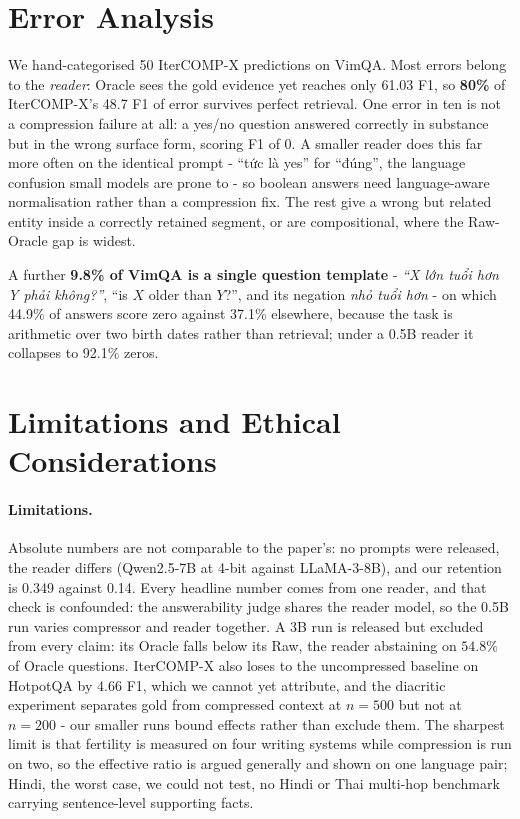 \documentclass{llncs}
\begin{document}
\section{Error Analysis}
\label{sec:vietnamese}
\label{sec:erroranalysis}
\label{app:errors}

We hand-categorised 50 IterCOMP-X predictions on VimQA. Most errors belong to the
\emph{reader}: Oracle sees the gold evidence yet reaches only 61.03 F1, so
\textbf{80\%} of IterCOMP-X's 48.7 F1 of error survives perfect retrieval. One
error in ten is not a compression failure at all: a yes/no question answered
correctly in substance but in the wrong surface form, scoring F1 of 0. A smaller reader does this far more often on the identical
prompt - ``tức là yes'' for ``đúng'', the language confusion small models are
prone to \cite{marchisio2024confusion} - so boolean answers need language-aware
normalisation rather than a compression fix. The rest give a wrong but related entity inside a correctly
retained segment, or are compositional, where the Raw-Oracle gap is widest.

A further \textbf{9.8\% of VimQA is a single question template} - \emph{``X lớn
tuổi hơn Y phải không?''}, ``is $X$ older than $Y$?'', and its negation
\emph{nhỏ tuổi hơn} - on which 44.9\% of answers score zero against 37.1\% elsewhere,
because the task is arithmetic over two birth dates rather than retrieval; under
a 0.5B reader it collapses to 92.1\% zeros.

\section{Limitations and Ethical Considerations}
\label{sec:limitations}

\paragraph{Limitations.} Absolute numbers are not comparable to the paper's: no
prompts were released, the reader differs (Qwen2.5-7B at 4-bit against
LLaMA-3-8B), and our retention is 0.349 against 0.14. Every headline number comes
from one reader, and that check is confounded: the answerability judge shares the
reader model, so the 0.5B run varies compressor and reader together. A 3B run is released but excluded
from every claim: its Oracle falls below its Raw, the reader abstaining on
$54.8\%$ of Oracle questions. IterCOMP-X also loses to the uncompressed baseline
on HotpotQA by $4.66$ F1, which we cannot yet attribute, and the diacritic
experiment separates gold from compressed context at $n=500$ but not at $n=200$
- our smaller runs bound effects rather than exclude them. The sharpest limit is
that fertility is measured on four writing systems while compression is run on
two, so the effective ratio is argued generally and shown on one language pair;
Hindi, the worst case, we could not test, no Hindi or Thai multi-hop benchmark
carrying sentence-level supporting facts.
\end{document}
